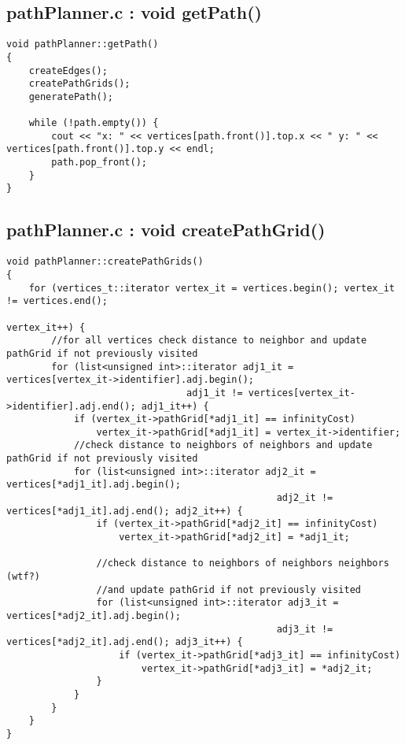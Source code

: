 \subsection{pathPlanner.c : void getPath()}
\label{app:getPath}
\begin{minipage}{\linewidth}
\begin{lstlisting}
void pathPlanner::getPath()
{
    createEdges();
    createPathGrids();
    generatePath();

    while (!path.empty()) {
        cout << "x: " << vertices[path.front()].top.x << " y: " << vertices[path.front()].top.y << endl;
        path.pop_front();
    }
}
\end{lstlisting}
\end{minipage}
\subsection{pathPlanner.c : void createPathGrid()}
\label{app:createPathGrid}
\begin{minipage}{\linewidth}
\begin{lstlisting}
void pathPlanner::createPathGrids()
{
    for (vertices_t::iterator vertex_it = vertices.begin(); vertex_it != vertices.end();
    																			 vertex_it++) {
    	//for all vertices check distance to neighbor and update pathGrid if not previously visited
        for (list<unsigned int>::iterator adj1_it = vertices[vertex_it->identifier].adj.begin(); 
        						adj1_it != vertices[vertex_it->identifier].adj.end(); adj1_it++) {
            if (vertex_it->pathGrid[*adj1_it] == infinityCost)
                vertex_it->pathGrid[*adj1_it] = vertex_it->identifier;
            //check distance to neighbors of neighbors and update pathGrid if not previously visited
            for (list<unsigned int>::iterator adj2_it = vertices[*adj1_it].adj.begin(); 
            									adj2_it != vertices[*adj1_it].adj.end(); adj2_it++) {
                if (vertex_it->pathGrid[*adj2_it] == infinityCost)
                    vertex_it->pathGrid[*adj2_it] = *adj1_it;

				//check distance to neighbors of neighbors neighbors (wtf?) 
				//and update pathGrid if not previously visited
                for (list<unsigned int>::iterator adj3_it = vertices[*adj2_it].adj.begin(); 
                								adj3_it != vertices[*adj2_it].adj.end(); adj3_it++) {
                    if (vertex_it->pathGrid[*adj3_it] == infinityCost)
                        vertex_it->pathGrid[*adj3_it] = *adj2_it;
                }
            }
        }
    }
}
\end{lstlisting}~\\
\end{minipage}
